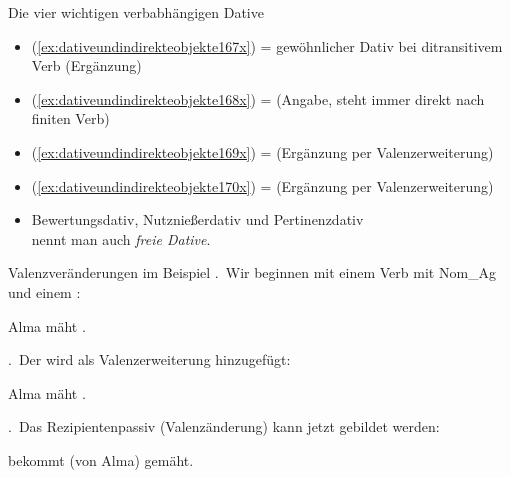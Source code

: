 \begin{frame}
  {Die vier wichtigen verbabhängigen Dative}
  \pause
  \begin{exe}
    \ex\label{ex:dativeundindirekteobjekte166x}
    \begin{xlist}
      \pause
      \pause
      \pause
    \end{xlist}
  \end{exe}
  \Halbzeile
  \pause
  \begin{itemize}[<+->]
    \item (\ref{ex:dativeundindirekteobjekte167x}) = gewöhnlicher Dativ bei ditransitivem Verb (Ergänzung)
      \Halbzeile
    \item (\ref{ex:dativeundindirekteobjekte168x}) =  (Angabe, steht immer direkt nach finiten Verb)
    \item (\ref{ex:dativeundindirekteobjekte169x}) =  (Ergänzung \alert{per Valenzerweiterung})
    \item (\ref{ex:dativeundindirekteobjekte170x}) =  (Ergänzung \alert{per Valenzerweiterung})
      \Halbzeile
    \item Bewertungsdativ, Nutznießerdativ und Pertinenzdativ\\
      nennt man auch \textit{freie Dative}.
  \end{itemize}
\end{frame}

\begin{frame}
  {Valenzveränderungen im Beispiel}
  .~Wir beginnen mit einem Verb mit \alert{Nom\_Ag} und einem :\\
  \pause
  \Halbzeile
  \begin{exe}
    \ex \alert{Alma} mäht .
  \end{exe}
  \Zeile
  .~Der  wird als Valenzerweiterung hinzugefügt:\\
  \pause
  \Halbzeile
  \begin{exe}
    \ex \alert{Alma} mäht  .
  \end{exe}
  \Zeile
  .~Das Rezipientenpassiv (Valenzänderung) kann jetzt gebildet werden:
  \pause
  \Halbzeile
  \begin{exe}
    \ex {} bekommt \alert{(von Alma)}  gemäht.
  \end{exe}
\end{frame}

